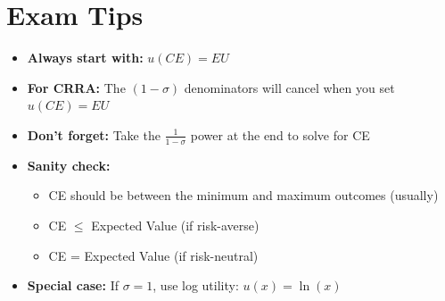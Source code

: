 \documentclass[12pt]{article}
\begin{document}
\section*{Exam Tips}

\begin{itemize}[leftmargin=*]
\item \textbf{Always start with:} $u(CE) = EU$

\item \textbf{For CRRA:} The $(1-\sigma)$ denominators will cancel when you set $u(CE) = EU$

\item \textbf{Don't forget:} Take the $\frac{1}{1-\sigma}$ power at the end to solve for CE

\item \textbf{Sanity check:}
\begin{itemize}
\item CE should be between the minimum and maximum outcomes (usually)
\item CE $\leq$ Expected Value (if risk-averse)
\item CE = Expected Value (if risk-neutral)
\end{itemize}

\item \textbf{Special case:} If $\sigma = 1$, use log utility: $u(x) = \ln(x)$
\end{itemize}
\end{document}
